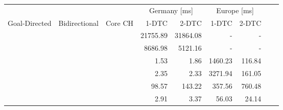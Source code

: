 \begin{tabular}{cccrrrrrr}
	\toprule
	              &               &         & \multicolumn{2}{c}{Germany [\si{\milli\second}]} & \multicolumn{2}{c}{Europe [\si{\milli\second}]}                 \\
	Goal-Directed & Bidirectional & Core CH & 1-DTC                                            & 2-DTC                                           & 1-DTC & 2-DTC \\
	\midrule
	\xmark        & \xmark        & \xmark  & 21755.89                                                & 31864.08                                               & -     & -     \\
	\xmark        & \cmark        & \xmark  & 8686.98                                                & 5121.16                                               & -     & -     \\
	\cmark        & \xmark        & \xmark  & 1.53                                                & 1.86                                               & 1460.23     & 116.84     \\
	\cmark        & \cmark        & \xmark  & 2.35                                                & 2.33                                               & 3271.94     & 161.05     \\
	\xmark        & \cmark        & \cmark  & 98.57                                                & 143.22                                               & 357.56     & 760.48     \\
	\cmark        & \cmark        & \cmark  & 2.91                                                & 3.37                                               & 56.03     & 24.14     \\
	\bottomrule
\end{tabular}